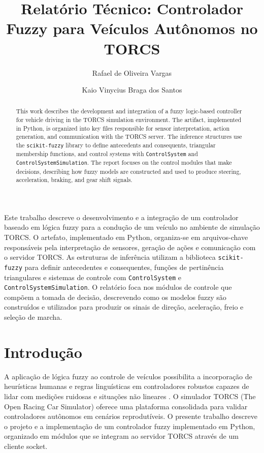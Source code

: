 \documentclass[12pt]{article}
\title{Relat\'orio T\'ecnico: Controlador Fuzzy para Ve\'iculos Aut\^onomos no TORCS}
\author{Rafael de Oliveira Vargas\inst{1} \and Kaio Vinycius Braga dos Santos\inst{1}}
\begin{document}
\maketitle

\begin{resumo}
Este trabalho descreve o desenvolvimento e a integra\c{c}\~ao de um controlador baseado em l\'ogica fuzzy para a condu\c{c}\~ao de um ve\'iculo no ambiente de simula\c{c}\~ao TORCS. O artefato, implementado em Python, organiza-se em arquivos-chave respons\'aveis pela interpreta\c{c}\~ao de sensores, gera\c{c}\~ao de a\c{c}\~oes e comunica\c{c}\~ao com o servidor TORCS. As estruturas de infer\^encia utilizam a biblioteca \texttt{scikit-fuzzy} para definir antecedentes e consequentes, fun\c{c}\~oes de pertin\^encia triangulares e sistemas de controle com \texttt{ControlSystem} e \texttt{ControlSystemSimulation}. O relat\'orio foca nos m\'odulos de controle que comp\~oem a tomada de decis\~ao, descrevendo como os modelos fuzzy s\~ao constru\'idos e utilizados para produzir os sinais de dire\c{c}\~ao, acelera\c{c}\~ao, freio e sele\c{c}\~ao de marcha.
\end{resumo}

\begin{abstract}
This work describes the development and integration of a fuzzy logic-based controller for vehicle driving in the TORCS simulation environment. The artifact, implemented in Python, is organized into key files responsible for sensor interpretation, action generation, and communication with the TORCS server. The inference structures use the \texttt{scikit-fuzzy} library to define antecedents and consequents, triangular membership functions, and control systems with \texttt{ControlSystem} and \texttt{ControlSystemSimulation}. The report focuses on the control modules that make decisions, describing how fuzzy models are constructed and used to produce steering, acceleration, braking, and gear shift signals.
\end{abstract}

\section{Introdu\c{c}\~ao}
A aplica\c{c}\~ao de l\'ogica fuzzy ao controle de ve\'iculos possibilita a incorpora\c{c}\~ao de heur\'isticas humanas e regras lingu\'isticas em controladores robustos capazes de lidar com medi\c{c}\~oes ruidosas e situa\c{c}\~oes n\~ao lineares \cite{zadeh1965, mamdani1975}. O simulador TORCS (The Open Racing Car Simulator) \cite{torcs2005} oferece uma plataforma consolidada para validar controladores aut\^onomos em cen\'arios reprodut\'iveis. O presente trabalho descreve o projeto e a implementa\c{c}\~ao de um controlador fuzzy implementado em Python, organizado em m\'odulos que se integram ao servidor TORCS atrav\'es de um cliente socket.
\end{document}
